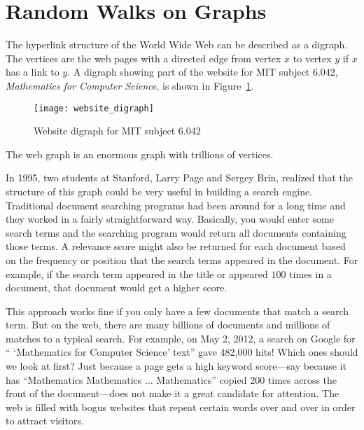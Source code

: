 \section{Random Walks on Graphs}\label{Google_sec}

\begin{editingnotes}


\end{editingnotes}

The hyperlink structure of the World Wide Web can be described as a
digraph.  The vertices are the web pages with a directed edge from
vertex $x$ to vertex $y$ if $x$ has a link to $y$.  A digraph showing
part of the website for MIT subject 6.042, \emph{Mathematics for
  Computer Science}, is shown in Figure~\ref{6042_webgraph}.

\begin{figure}
\centerline{\texttt{[image: website\_digraph]}}
\caption{Website digraph for MIT subject 6.042}
\label{6042_webgraph}
\end{figure}

The web graph is an enormous graph with trillions of vertices.
\iffalse
At first glance, this graph wouldn't seem to be very interesting.  But\fi
In 1995, two students at Stanford,  Larry Page and
 Sergey Brin, realized that the structure of this
graph could be very useful in building a search engine.  Traditional
document searching programs had been around for a long time and they
worked in a fairly straightforward way.  Basically, you would enter
some search terms and the searching program would return all documents
containing those terms.  A relevance score might also be returned for
each document based on the frequency or position that the search terms
appeared in the document.  For example, if the search term appeared in
the title or appeared $100$ times in a document, that document would
get a higher score.  \iffalse
So if an author wanted a document to get a higher
score for certain keywords, he would put the keywords in the title and
make it appear in lots of places.  You can even see this today with
some bogus web sites.\fi

This approach works fine if you only have a few documents that match a
search term.  But on the web, there are many billions of documents and
millions of matches to a typical search.  For example, on May 2, 2012,
a search on Google for `` `Mathematics for Computer Science' text''
gave 482,000 hits!  Which ones should we look at first?  Just because
a page gets a high keyword score---say because it has ``Mathematics
Mathematics $\dots$ Mathematics'' copied 200 times across the front of
the document---does not make it a great candidate for attention.  The
web is filled with bogus websites that repeat certain words over and
over in order to attract visitors.

